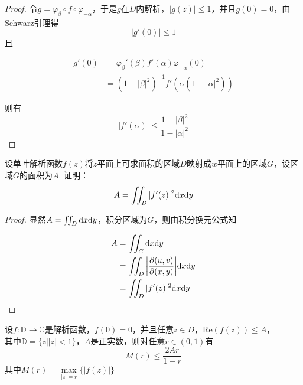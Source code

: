 \begin{proof}
    
    令$g = \varphi_{\beta}\circ f \circ \varphi_{-\alpha}$，于是$g$在$D$内解析，$|g(z)| \leq 1$，并且$g(0) = 0$，由\textup{Schwarz}引理得
    $$|g'(0)| \leq 1$$
    且
    
    \begin{align*}
        g'(0) & = \varphi_{\beta}'(\beta) f'(\alpha) \varphi_{-\alpha}(0) \\
        & =  (1 - |\beta|^2)^{-1}f'(\alpha (1 - |\alpha|^2))
    \end{align*}

    则有
    $$|f'(\alpha)| \leq \dfrac{1 - |\beta|^2}{1 - |\alpha|^2}$$

\end{proof}

\begin{proposition}
    
    设单叶解析函数$f(z)$将$z$平面上可求面积的区域$D$映射成$w$平面上的区域$G$，设区域$G$的面积为$A$. 证明：
    $$ A = \iint_{D}{|f'(z)|^2}\mathrm{d} x\mathrm{d} y$$

\end{proposition}

\begin{proof}
    
    显然$A = \iint_{D}\mathrm{d} x\mathrm{d} y$，积分区域为$G$，则由积分换元公式知

    \begin{align*}
        A & = \iint_{G}\mathrm{d} x\mathrm{d} y \\
          & = \iint_{D}{\left| \dfrac{\partial(u, v)}{\partial(x, y)} \right|}\mathrm{d} x\mathrm{d} y \\
          & = \iint_{D}{|f'(z)|^2}\mathrm{d} x\mathrm{d} y
    \end{align*}

\end{proof}

\begin{proposition}
    
    设$f:\mathbb{D} \to \mathbb{C}$是解析函数，$f(0) = 0$，并且任意$z \in D$，$\mathrm{Re}(f(z)) \leq A$，\\
    其中$\mathbb{D} = \{z \big| |z| < 1\}$，$A$是正实数，则对任意$r \in (0, 1)$有
    $$M(r) \leq \dfrac{2Ar}{1 - r}$$
    其中$M(r) = \max\limits_{|z| = r}\{|f(z)|\}$

\end{proposition}

